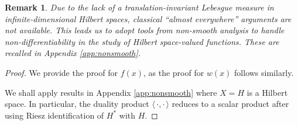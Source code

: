 \documentclass[12pt]{amsart}
\numberwithin{equation}{section}
\newtheorem{remark}[theorem]{Remark}
\begin{document}
\begin{remark}
 Due to the lack of a translation-invariant Lebesgue measure in infinite-dimensional Hilbert spaces, classical ``almost everywhere'' arguments are not available. This leads us to adopt tools from non-smooth analysis to handle non-differentiability in the study of Hilbert space-valued functions. These are recalled in Appendix \ref{app:nonsmooth}.    
\end{remark}
\begin{proof}

We provide the proof for $f(x)$, as the proof for $w(x)$ follows similarly.

We shall apply results in Appendix \ref{app:nonsmooth} where $X=H$ is a Hilbert space. In particular, the duality product $\langle\,\cdot,\cdot\,\rangle$ reduces to a scalar product after using Riesz identification of $H^*$ with $H$. 


\end{proof}
\end{document}
